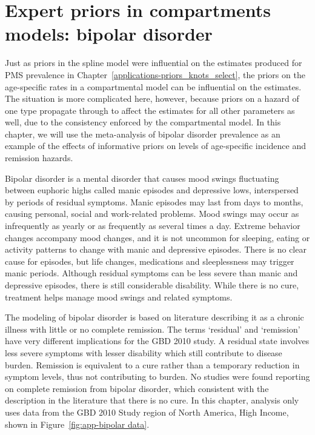 \chapter{Expert priors in compartments models: bipolar disorder}
\label{applications-prior_level_vals}

Just as priors in the spline model were influential on the estimates
produced for PMS prevalence in
Chapter~\ref{applications-priors_knots_select}, the priors on the
age-specific rates in a compartmental model can be influential on the
estimates.  The situation is more complicated here, however, because
priors on a hazard of one type propagate through to affect the
estimates for all other parameters as well, due to the consistency
enforced by the compartmental model.  In this chapter, we will use the
meta-analysis of bipolar disorder prevalence as an example of the
effects of informative priors on levels of age-specific incidence and
remission hazards.

Bipolar disorder is a mental disorder that causes mood swings
fluctuating between euphoric highs called manic episodes and
depressive lows, interspersed by periods of residual symptoms.  Manic
episodes may last from days to months, causing personal, social and
work-related problems.  Mood swings may occur as infrequently as
yearly or as frequently as several times a day.  Extreme behavior
changes accompany mood changes, and it is not uncommon for sleeping,
eating or activity patterns to change with manic and depressive
episodes.  There is no clear cause for episodes, but life changes,
medications and sleeplessness may trigger manic periods.
Although residual symptoms can be less severe than manic
and depressive episodes, there is still considerable disability.  While there
is no cure, treatment helps manage mood swings and related
symptoms. \cite{kloos_bipolar_2011, angst_historical_2000}

The modeling of bipolar disorder is based on literature describing it
as a chronic illness with little or no complete remission.
The terms `residual' and `remission' have very different implications
for the GBD 2010 study.  A residual state involves less severe
symptoms with lesser disability which still contribute to disease
burden.  Remission is equivalent to a cure rather than a temporary
reduction in symptom levels, thus not contributing to burden.  No studies
were found reporting on complete remission from bipolar disorder,
which consistent with the description in the literature that there
is no cure. \cite{american_psychiatric_association_diagnostic_2000}
In this chapter, analysis
only uses data from the GBD 2010 Study region of North America, High Income,
shown in Figure~\ref{fig:app-bipolar data}.

